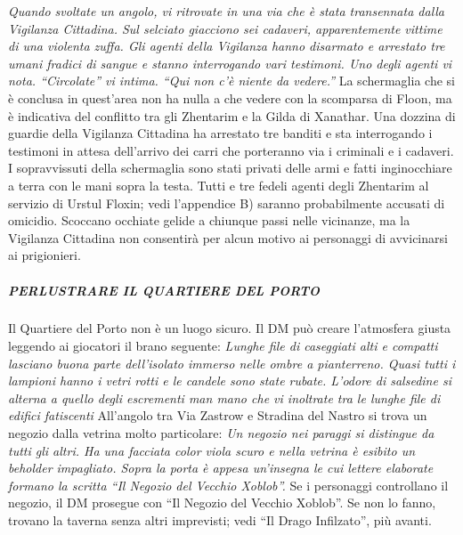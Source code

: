 \documentclass{article}
\begin{document}
\textit{Quando svoltate un angolo, vi ritrovate in una via che è stata transennata dalla Vigilanza Cittadina. Sul selciato giacciono sei cadaveri, apparentemente vittime di una violenta zuffa. Gli agenti della Vigilanza hanno disarmato e arrestato tre umani fradici di sangue e stanno interrogando vari testimoni. Uno degli agenti vi nota. 
“Circolate” vi intima. “Qui non c'è niente da vedere.”}
\newline
    La schermaglia che si è conclusa in quest'area non ha nulla a che vedere con la scomparsa di Floon, ma è indicativa del conflitto tra gli Zhentarim e la Gilda di Xanathar. 
Una dozzina di guardie della Vigilanza Cittadina ha arrestato tre banditi e sta interrogando i testimoni in attesa dell’arrivo dei carri che porteranno via i criminali e i cadaveri. I sopravvissuti della schermaglia sono stati privati delle armi e fatti inginocchiare a terra con le mani sopra la testa. Tutti e tre fedeli agenti degli Zhentarim al servizio di Urstul Floxin; vedi l’appendice B) saranno probabilmente accusati di omicidio. Scoccano occhiate gelide a chiunque passi nelle vicinanze, ma la Vigilanza Cittadina non consentirà per alcun motivo ai personaggi di avvicinarsi ai prigionieri.

\subparagraph{PERLUSTRARE IL QUARTIERE DEL PORTO}Il Quartiere del Porto non è un luogo sicuro. Il DM può creare l'atmosfera giusta leggendo ai giocatori il brano seguente:\newline
\textit{Lunghe file di caseggiati alti e compatti lasciano buona parte dell'isolato immerso nelle ombre a pianterreno. 
Quasi tutti i lampioni hanno i vetri rotti e le candele sono state rubate. L'odore di salsedine si alterna a quello degli escrementi man mano che vi inoltrate tra le lunghe file di edifici fatiscenti}\newline
All’angolo tra Via Zastrow e Stradina del Nastro si trova un negozio dalla vetrina molto particolare:\newline
\textit{Un negozio nei paraggi si distingue da tutti gli altri. Ha una facciata color viola scuro e nella vetrina è esibito un beholder impagliato. Sopra la porta è appesa un'insegna le cui lettere elaborate formano la scritta “Il Negozio del Vecchio Xoblob”.}\newline
Se i personaggi controllano il negozio, il DM prosegue con “Il Negozio del Vecchio Xoblob”. Se non lo fanno, trovano la taverna senza altri imprevisti; vedi “Il Drago Infilzato”, più avanti.
\end{document}

